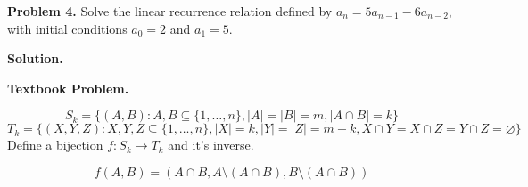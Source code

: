 \textbf{Problem 4.} Solve the linear recurrence relation defined by
$ a_n=5a_{n-1}-6a_{n-2} $, with initial conditions $ a_0=2 $
and $ a_1=5 $.

\textbf{Solution.}

\textbf{Textbook Problem.}

\[ S_k=\{(A,B): A,B\subseteq \{1,\ldots ,n\},|A|=|B|=m,|A\cap B|=k\} \]
\[ T_k=\{(X,Y,Z):X,Y,Z\subseteq \{1,\ldots ,n\},|X|=k,|Y|=|Z|=m-k,
    X\cap Y=X\cap Z=Y\cap Z=\varnothing\} \]
Define a bijection $ f:S_k\rightarrow T_k $ and it's inverse.

\[ f(A,B)=(A\cap B, A\setminus (A\cap B), B\setminus (A\cap B)) \]
